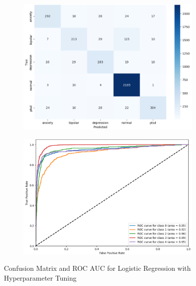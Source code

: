 \begin{figure}[h!]
    \centering
    \begin{subfigure}[b]{0.49\textwidth}
        \centering
        \includegraphics[width=\textwidth]{Images/HP LR CM.png}
        \label{LSTMROC2}  %
    \end{subfigure}
    \hfill
    \begin{subfigure}[b]{0.49\textwidth}
        \centering
        \includegraphics[width=\textwidth]{Images/HP LR ROC.png}
        \label{LSTMROC3}  %
    \end{subfigure}
    \vspace{-2em}
    \caption*{Confusion Matrix and ROC AUC for Logistic Regression with Hyperparameter Tuning}
    \label{fig:hp_lr_comparison}
\end{figure}

